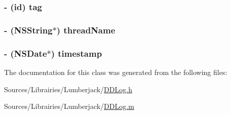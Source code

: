 \hypertarget{interface_d_d_log_message_ad3a1f2556f02542c6456d50a690800f1}{
\subsubsection[{tag}]{\setlength{\rightskip}{0pt plus 5cm}-\/ (id) tag}}\label{interface_d_d_log_message_ad3a1f2556f02542c6456d50a690800f1}
\hypertarget{interface_d_d_log_message_a5b666ceeda61a575e35e52e22a68436c}{
\subsubsection[{thread\-Name}]{\setlength{\rightskip}{0pt plus 5cm}-\/ (N\-S\-String$\ast$) thread\-Name}}\label{interface_d_d_log_message_a5b666ceeda61a575e35e52e22a68436c}
\hypertarget{interface_d_d_log_message_a405819fd179c0816e2c7a061168429a6}{
\subsubsection[{timestamp}]{\setlength{\rightskip}{0pt plus 5cm}-\/ (N\-S\-Date$\ast$) timestamp}}\label{interface_d_d_log_message_a405819fd179c0816e2c7a061168429a6}


The documentation for this class was generated from the following files\-:\begin{DoxyCompactItemize}
\item 
Sources/\-Librairies/\-Lumberjack/\hyperlink{_d_d_log_8h}{D\-D\-Log.\-h}\item 
Sources/\-Librairies/\-Lumberjack/\hyperlink{_d_d_log_8m}{D\-D\-Log.\-m}\end{DoxyCompactItemize}
